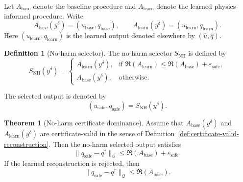 \documentclass{article}
\numberwithin{equation}{section}
\theoremstyle{definition}
\newtheorem{definition}{Definition}
\newtheorem{theorem}{Theorem}
\begin{document}
Let \(A_{\mathrm{base}}\) denote the baseline procedure and \(A_{\mathrm{learn}}\) denote the learned physics-informed procedure. Write
\begin{equation}
A_{\mathrm{base}}(y^\delta)
=
(u_{\mathrm{base}},q_{\mathrm{base}}),
\qquad
A_{\mathrm{learn}}(y^\delta)
=
(u_{\mathrm{learn}},q_{\mathrm{learn}}).
\label{eq:base-learn-procedure-outputs}
\end{equation}
Here \((u_{\mathrm{learn}},q_{\mathrm{learn}})\) is the learned output denoted elsewhere by \((\widehat u,\widehat q)\).

\begin{definition}[No-harm selector]
\label{def:no-harm-selector}
The no-harm selector \(S_{\mathrm{NH}}\) is defined by
\begin{equation}
S_{\mathrm{NH}}(y^\delta)
=
\begin{cases}
	A_{\mathrm{learn}}(y^\delta),
	&
	\text{if }
	\mathfrak R(A_{\mathrm{learn}})
	\le
	\mathfrak R(A_{\mathrm{base}})+\varepsilon_{\mathrm{safe}},
	\\[0.4em]
	A_{\mathrm{base}}(y^\delta),
	&
	\text{otherwise}.
\end{cases}
\label{eq:no-harm-selector}
\end{equation}
\end{definition}

The selected output is denoted by
\begin{equation}
(u_{\mathrm{safe}},q_{\mathrm{safe}})
=
S_{\mathrm{NH}}(y^\delta).
\label{eq:selected-safe-output}
\end{equation}

\begin{theorem}[No-harm certificate dominance]
\label{thm:no-harm-principle}
Assume that \(A_{\mathrm{base}}(y^\delta)\) and \(A_{\mathrm{learn}}(y^\delta)\) are certificate-valid in the sense of Definition~\ref{def:certificate-valid-reconstruction}. Then the no-harm selected output satisfies
\begin{equation}
\|q_{\mathrm{safe}}-q^\dagger\|_{\mathcal Q}
\le
\mathfrak R(A_{\mathrm{base}})
+
\varepsilon_{\mathrm{safe}}.
\label{eq:no-harm-dominance}
\end{equation}
If the learned reconstruction is rejected, then
\begin{equation}
\|q_{\mathrm{safe}}-q^\dagger\|_{\mathcal Q}
\le
\mathfrak R(A_{\mathrm{base}}).
\label{eq:no-harm-rejected-dominance}
\end{equation}
\end{theorem}
\end{document}
